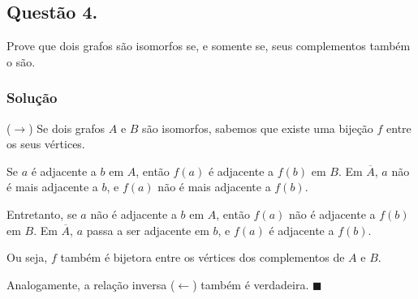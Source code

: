 \documentclass[12pt, letterpaper]{report}
\newcommand*{\CQD}{\hfill\ensuremath{\blacksquare}}%
\newcounter{ProblemNum}
\newcommand*{\anyproblem}[1]{\newpage\subsection*{#1}}
\newcommand*{\problem}[1]{\stepcounter{ProblemNum} %
   \anyproblem{Questão #1}}
\newcommand*{\soln}[1]{\subsubsection*{#1}}
\newcommand*{\solution}{\soln{Solução}}
\begin{document}
\problem{4.}
    Prove que dois grafos são isomorfos se, e somente se, seus complementos também o são.

\solution
    ($\rightarrow$) Se dois grafos $A$ e $B$ são isomorfos, sabemos que existe uma bijeção $f$ entre os seus vértices.

    Se $a$ é adjacente a $b$ em $A$, então $f(a)$ é adjacente a $f(b)$ em $B$. Em $\overline{A}$, $a$ não é mais adjacente a $b$, e $f(a)$ não é mais adjacente a $f(b)$.

    Entretanto, se $a$ não é adjacente a $b$ em $A$, então $f(a)$ não é adjacente a $f(b)$ em $B$. Em $\overline{A}$, $a$ passa a ser adjacente em $b$, e $f(a)$ é adjacente a $f(b)$.

    Ou seja, $f$ também é bijetora entre os vértices dos complementos de $A$ e $B$. 

    Analogamente, a relação inversa ($\leftarrow$) também é verdadeira. \CQD
\end{document}

